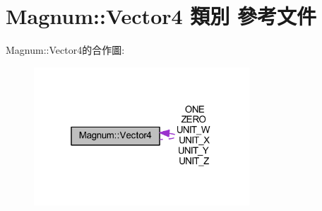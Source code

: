 \hypertarget{class_magnum_1_1_vector4}{}\section{Magnum\+:\+:Vector4 類別 參考文件}
\label{class_magnum_1_1_vector4}


Magnum\+:\+:Vector4的合作圖\+:\nopagebreak
\begin{figure}[H]
\begin{center}
\leavevmode
\includegraphics[width=229pt]{class_magnum_1_1_vector4__coll__graph}
\end{center}
\end{figure}
